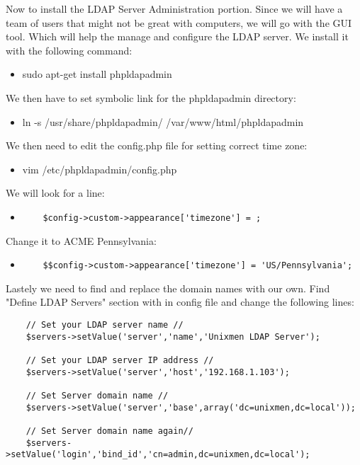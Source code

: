 \noindent Now to install the LDAP Server Administration portion. Since we will 
have a team of users that might not be great with computers, we will go with
the GUI tool. Which will help the manage and configure the LDAP server.
We install it with the following command:

\begin{itemize}
	\item sudo apt-get install phpldapadmin
\end{itemize}

\vspace{.5em}

\noindent We then have to set symbolic link for the phpldapadmin directory:

\begin{itemize}
	\item ln -s /usr/share/phpldapadmin/ /var/www/html/phpldapadmin
\end{itemize}

\vspace{.5em}

\noindent We then need to edit the config.php file for setting correct time 
zone:

\begin{itemize}
	\item vim /etc/phpldapadmin/config.php
\end{itemize}

\vspace{.5em}

\noindent We will look for a line:
\begin{itemize}
	\item \begin{verbatim}
	$config->custom->appearance['timezone'] = ;
	\end{verbatim} 
\end{itemize} 

\vspace{.5em}

\noindent Change it to ACME Pennsylvania:
\begin{itemize}
	\item \begin{verbatim}
	$$config->custom->appearance['timezone'] = 'US/Pennsylvania';
	\end{verbatim}
\end{itemize}

\vspace{.5em}

\noindent Lastely we need to find and replace the domain names with our own. 
Find "Define LDAP Servers" section with in config file and 
change the following lines:
\begin{verbatim}
	// Set your LDAP server name //
	$servers->setValue('server','name','Unixmen LDAP Server');
	
	// Set your LDAP server IP address // 
	$servers->setValue('server','host','192.168.1.103');
	
	// Set Server domain name //
	$servers->setValue('server','base',array('dc=unixmen,dc=local'));
	
	// Set Server domain name again//
	$servers->setValue('login','bind_id','cn=admin,dc=unixmen,dc=local');
\end{verbatim}


